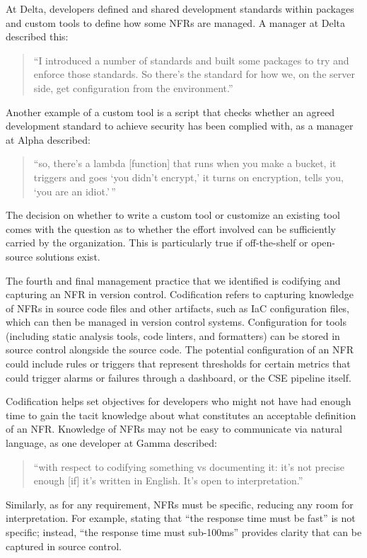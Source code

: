\documentclass[smallextended]{svjour3}       %
\begin{document}
\noindent At Delta, developers defined and shared development standards within packages and custom tools to define how some NFRs are managed. A manager at Delta described this:
\begin{quote}
    ``I introduced a number of standards and built some packages to try and enforce those standards. So there's the standard for how we, on the server side, get configuration from the environment.''
\end{quote}
Another example of a custom tool is a script that checks whether an agreed development standard to achieve security has been complied with, as a manager at Alpha described:
\begin{quote}
    ``so, there's a lambda [function] that runs when you make a bucket, it triggers and goes `you didn't encrypt,' it turns on encryption, tells you, `you are an idiot.'\,''    
\end{quote}


The decision on whether to write a custom tool or customize an existing tool comes with the question as to whether the effort involved can be sufficiently carried by the organization. This is particularly true if off-the-shelf or open-source solutions exist.

The fourth and final management practice that we identified is codifying and capturing an NFR in version control. 
Codification refers to capturing knowledge of NFRs in source code files and other artifacts, such as IaC configuration files, which can then be managed in version control systems.
Configuration for tools (including static analysis tools, code linters, and formatters) can be stored in source control alongside the source code.
The potential configuration of an NFR could include rules or triggers that represent thresholds for certain metrics that could trigger alarms or failures through a dashboard, or the CSE pipeline itself.



Codification helps set objectives for developers who might not have had enough time to gain the tacit knowledge about what constitutes an acceptable definition of an NFR.
Knowledge of NFRs may not be easy to communicate via natural language, as one developer at Gamma described:
\begin{quote}
    ``with respect to codifying something vs documenting it: it's not precise enough [if] it's written in English. It's open to interpretation.''
\end{quote}
Similarly, as for any requirement, NFRs must be specific, reducing any room for interpretation. For example, stating that ``the response time must be fast'' is not specific; instead, ``the response time must sub-100ms'' provides clarity that can be captured in source control. 
\end{document}
